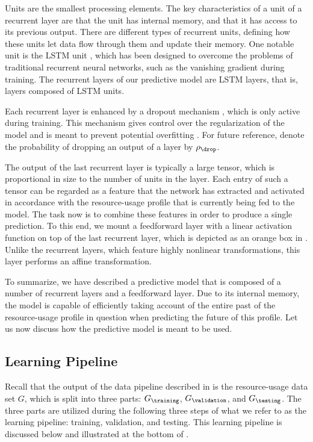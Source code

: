 Units are the smallest processing elements. The key characteristics of a unit of
a recurrent layer are that the unit has internal memory, and that it has access
to its previous output. There are different types of recurrent units, defining
how these units let data flow through them and update their memory. One notable
unit is the \ac{LSTM} unit \cite{hochreiter1997}, which has been designed to
overcome the problems of traditional recurrent neural networks, such as the
vanishing gradient during training. The recurrent layers of our predictive model
are \ac{LSTM} layers, that is, layers composed of \ac{LSTM} units.

Each recurrent layer is enhanced by a dropout mechanism \cite{zaremba2014},
which is only active during training. This mechanism gives control over the
regularization of the model and is meant to prevent potential overfitting
\cite{hastie2013}. For future reference, denote the probability of dropping an
output of a layer by $\rho_\drop$.

The output of the last recurrent layer is typically a large tensor, which is
proportional in size to the number of units in the layer. Each entry of such a
tensor can be regarded as a feature that the network has extracted and activated
in accordance with the resource-usage profile that is currently being fed to the
model. The task now is to combine these features in order to produce a single
prediction. To this end, we mount a feedforward layer with a linear activation
function on top of the last recurrent layer, which is depicted as an orange box
in . Unlike the recurrent layers, which feature
highly nonlinear transformations, this layer performs an affine transformation.

To summarize, we have described a predictive model that is composed of a number
of recurrent layers and a feedforward layer. Due to its internal memory, the
model is capable of efficiently taking account of the entire past of the
resource-usage profile in question when predicting the future of this profile.
Let us now discuss how the predictive model is meant to be used.

\subsection{Learning Pipeline}

Recall that the output of the data pipeline described in
 is the resource-usage data set $G$, which is split
into three parts: $G_\training$, $G_\validation$, and $G_\testing$. The three
parts are utilized during the following three steps of what we refer to as the
learning pipeline: training, validation, and testing. This learning pipeline is
discussed below and illustrated at the bottom of .

